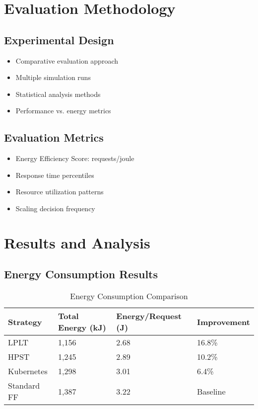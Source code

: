 \documentclass[12pt,a4paper]{report}
\begin{document}
\section{Evaluation Methodology}

\subsection{Experimental Design}
\begin{itemize}[leftmargin=1cm]
    \item Comparative evaluation approach
    \item Multiple simulation runs
    \item Statistical analysis methods
    \item Performance vs. energy metrics
\end{itemize}

\subsection{Evaluation Metrics}
\begin{itemize}[leftmargin=1cm]
    \item Energy Efficiency Score: requests/joule
    \item Response time percentiles
    \item Resource utilization patterns
    \item Scaling decision frequency
\end{itemize}

\section{Results and Analysis}
\subsection{Energy Consumption Results}

\begin{table}[h]
\centering
\caption{Energy Consumption Comparison}
\begin{tabular}{llll}
\toprule
\textbf{Strategy} & \textbf{Total Energy (kJ)} & \textbf{Energy/Request (J)} & \textbf{Improvement} \\
\midrule
LPLT & 1,156 & 2.68 & 16.8\% \\
HPST & 1,245 & 2.89 & 10.2\% \\
Kubernetes & 1,298 & 3.01 & 6.4\% \\
Standard FF & 1,387 & 3.22 & Baseline \\
\bottomrule
\end{tabular}
\end{table}
\end{document}
